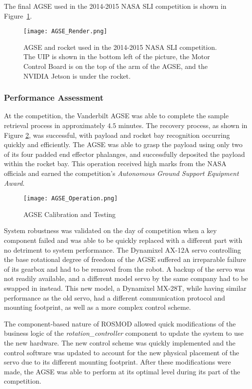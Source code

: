 The final AGSE used in the 2014-2015 NASA SLI competition is shown in
Figure~\ref{fig:competition_AGSE}.

\begin{figure}[h]
	\centering
	\texttt{[image: AGSE\_Render.png]}
	\caption{AGSE and rocket used in the 2014-2015 NASA SLI
		competition.  The UIP is shown in the bottom left of the
		picture, the Motor Control Board is on the top of the arm of
		the AGSE, and the NVIDIA Jetson is under the rocket.}
	\label{fig:competition_AGSE}
\end{figure}
\FloatBarrier

\subsubsection{Performance Assessment}

At the competition, the Vanderbilt AGSE was able to complete the
sample retrieval process in approximately $4.5$ minutes. The recovery
process, as shown in Figure \ref{fig:AGSE_Operation}, was successful,
with payload and rocket bay recognition occurring quickly and
efficiently. The AGSE was able to grasp the payload using only two of
its four padded end effector phalanges, and successfully deposited the
payload within the rocket bay. This operation received high marks from
the NASA officials and earned the competition's \emph{Autonomous
	Ground Support Equipment Award}.

\begin{figure}[t]
	\centering
	\texttt{[image: AGSE\_Operation.png]}
	\caption{AGSE Calibration and Testing}
	\label{fig:AGSE_Operation}	
\end{figure}
\FloatBarrier

System robustness was validated on the day of competition when a key
component failed and was able to be quickly replaced with a different
part with no detriment to system performance. The Dynamixel AX-12A
servo controlling the base rotational degree of freedom of the AGSE
suffered an irreparable failure of its gearbox and had to be removed
from the robot. A backup of the servo was not readily available, and a
different model servo by the same company had to be swapped in
instead.  This new model, a Dynamixel MX-28T, while having similar
performance as the old servo, had a different communication protocol
and mounting footprint, as well as a more complex control scheme.

The component-based nature of ROSMOD allowed quick modifications of
the business logic of the \emph{rotation\_controller} component to
update the system to use the new hardware.  The new control scheme was
quickly implemented and the control software was updated to account
for the new physical placement of the servo due to its different
mounting footprint. After these modifications were made, the AGSE was
able to perform at its optimal level during its part of the
competition.

\fi


